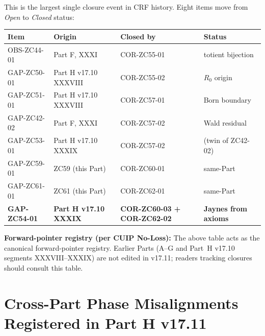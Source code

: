 \documentclass[12pt, a4paper]{article}
\begin{document}
\begin{conmapbox}[title={v17.11 Master Closure Table}]
This is the largest single closure event in CRF history. Eight items
move from \emph{Open} to \emph{Closed} status:

\begin{longtable}{@{}p{3.6cm}p{2.8cm}p{2.6cm}p{4.5cm}@{}}
\toprule
\textbf{Item} & \textbf{Origin} & \textbf{Closed by} & \textbf{Status}\\
\midrule
\endhead
OBS-ZC44-01 & Part F, XXXI & COR-ZC55-01 & \closedcheck{} totient bijection\\
GAP-ZC50-01 & Part H v17.10 XXXVIII & COR-ZC55-02 & \closedcheck{} $R_0$ origin\\
GAP-ZC51-01 & Part H v17.10 XXXVIII & COR-ZC57-01 & \closedcheck{} Born boundary\\
GAP-ZC42-02 & Part F, XXXI & COR-ZC57-02 & \closedcheck{} Wald residual\\
GAP-ZC53-01 & Part H v17.10 XXXIX & COR-ZC57-02 & \closedcheck{} (twin of ZC42-02)\\
GAP-ZC59-01 & ZC59 (this Part) & COR-ZC60-01 & \closedcheck{} same-Part\\
GAP-ZC61-01 & ZC61 (this Part) & COR-ZC62-01 & \closedcheck{} same-Part\\
\textbf{GAP-ZC54-01} & \textbf{Part H v17.10 XXXIX} & \textbf{COR-ZC60-03 + COR-ZC62-02} & \closedcheck{} \textbf{Jaynes from axioms}\\
\bottomrule
\end{longtable}

\medskip
\textbf{Forward-pointer registry (per CUIP No-Loss):} The above table
acts as the canonical forward-pointer registry. Earlier Parts (A--G
and Part~H v17.10 segments XXXVIII--XXXIX) are not edited in v17.11;
readers tracking closures should consult this table.
\end{conmapbox}

\section{Cross-Part Phase Misalignments Registered in Part H v17.11}
\label{sec:xlii-pm}
\end{document}

